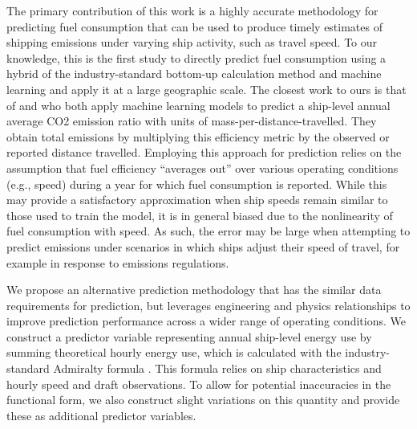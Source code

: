 The primary contribution of this work is a highly accurate methodology for predicting fuel consumption that can be used to produce timely estimates of shipping emissions under varying ship activity, such as travel speed. To our knowledge, this is the first study to directly predict fuel consumption using a hybrid of the industry-standard bottom-up calculation method and machine learning and apply it at a large geographic scale. The closest work to ours is that of \textcite{yan2023analysis} and \textcite{clarke2023co2} who both apply machine learning models to predict a ship-level annual average \ac{CO2} emission ratio with units of mass-per-distance-travelled. They obtain total emissions by multiplying this efficiency metric by the observed or reported distance travelled. Employing this approach for prediction relies on the assumption that fuel efficiency ``averages out'' over various operating conditions (e.g., speed) during a year for which fuel consumption is reported. While this may provide a satisfactory approximation when ship speeds remain similar to those used to train the model, it is in general biased due to the nonlinearity of fuel consumption with speed. As such, the error may be large when attempting to predict emissions under scenarios in which ships adjust their speed of travel, for example in response to emissions regulations.

We propose an alternative prediction methodology that has the similar data requirements for prediction, but leverages engineering and physics relationships to improve prediction performance across a wider range of operating conditions. We construct a predictor variable representing annual ship-level energy use by summing theoretical hourly energy use, which is calculated with the industry-standard Admiralty formula \parencite[p.~64]{faber2020fourth}. This formula relies on ship characteristics and hourly speed and draft observations. To allow for potential inaccuracies in the functional form, we also construct slight variations on this quantity and provide these as additional predictor variables.


